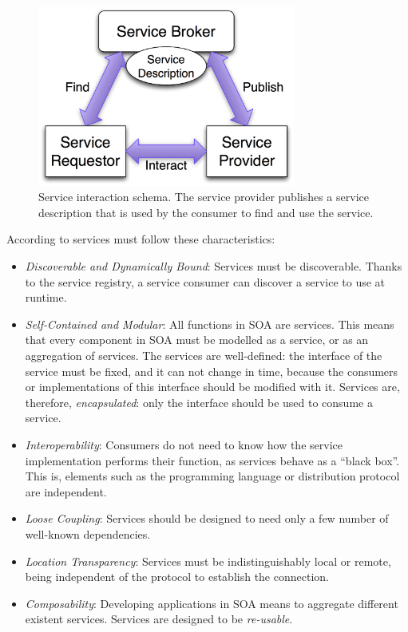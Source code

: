 \begin{figure}
\centering
\includegraphics[width=20pc]{gfx/soa/soaDiagram.jpg}
\caption{Service interaction schema. The service provider publishes a
  service description that is used by the consumer to find and use the
  service.} %
\label{fig:soadiagram}
\end{figure}

According to  \cite{Valipour09surveysoa} services must follow these characteristics:

\begin{itemize}
\item {\em Discoverable and Dynamically Bound}: Services must be discoverable. Thanks to the service registry, a service consumer can discover a service to use at runtime.
\item {\em Self-Contained and Modular}: All functions in SOA are services. This means that every
  component in SOA must be modelled as a service, or as an aggregation of services. The services are well-defined: the interface of the service must be fixed, and it can not change in time, because the consumers or implementations of this interface should be modified with it. Services are, therefore, {\em encapsulated}: only the interface should be used to consume a service.
\item {\em Interoperability}: Consumers do not need to know how the service implementation performs their function, as services behave as a ``black box''. This is, elements such as the programming language or distribution protocol are independent.
\item {\em Loose Coupling}: Services should be designed to need only a few number of well-known dependencies.
\item {\em Location Transparency}: Services must be indistinguishably local or remote, being independent of the protocol to establish the connection.
\item {\em Composability}: Developing applications in SOA means to aggregate different existent services. Services are designed to be {\em re-usable}.
\end{itemize}



